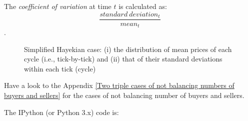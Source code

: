 \documentclass[10pt]{report}
\begin{document}
The \emph{coefficient of variation} at time $t$ is calculated as: $$\frac{standard~deviation_t}{mean_t}$$.

\begin{figure}[H]
\begin{center}
\caption{Simplified Hayekian case: (i) the distribution of mean prices of each cycle (i.e., tick-by-tick) and (ii) that of their standard deviations within each tick (cycle)}
\label{output_3_3.png}
\end{center}
\end{figure}

\begin{center}
\end{center}

\bigskip

Have a look to the Appendix \ref{Two triple cases of not balancing numbers of buyers and sellers} for the cases of not balancing number of buyers and sellers.

The IPython (or Python 3.x) code is:
\end{document}
